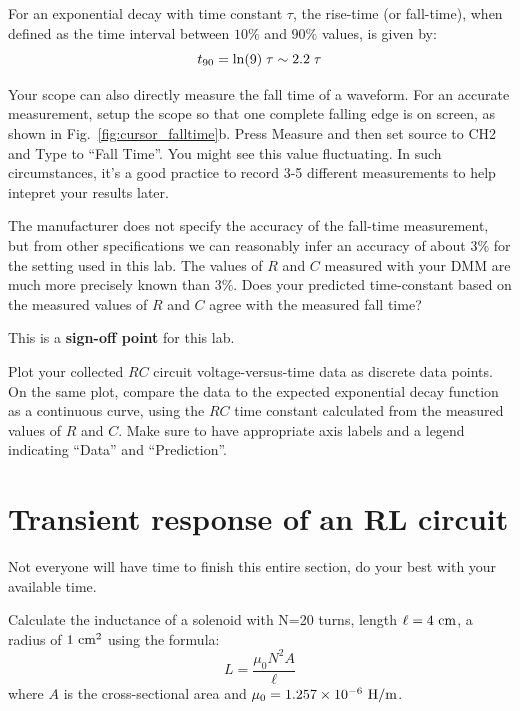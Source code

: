 For an exponential decay with time constant $\tau$, the rise-time (or fall-time),
when defined as the time interval between $10\%$ and $90\%$ values, is
given by:
\begin{displaymath}
t_{90} = {\rm ln}(9) \; \tau \sim 2.2 \; \tau
\end{displaymath}

\begin{measurement}
Your scope can also directly measure the fall time of a waveform.  For
an accurate measurement, setup the scope so that one complete falling
edge is on screen, as shown in Fig.~\ref{fig:cursor_falltime}b.  Press
Measure and then set source to CH2 and Type to ``Fall Time''. You
might see this value fluctuating.  In such circumstances, it's a good
practice to record 3-5 different measurements to help intepret your
results later.

The manufacturer does not specify the accuracy of the fall-time
measurement, but from other specifications we can reasonably infer an
accuracy of about $3\%$ for the setting used in this lab.  The values of $R$ and $C$ measured with your DMM are much more precisely known than $3\%$.  Does your predicted time-constant based on the measured values of $R$ and $C$ agree with the measured fall time?
\end{measurement}

This is a \textbf{sign-off point} for this lab.

\begin{plot}
Plot your collected $RC$ circuit voltage-versus-time data as discrete
data points.  On the same plot, compare the data to the expected
exponential decay function as a continuous curve, using the $RC$ time
constant calculated from the measured values of $R$ and $C$.  Make
sure to have appropriate axis labels and a legend indicating ``Data''
and ``Prediction''.
\end{plot}
  
\section{Transient response of an RL circuit}

Not everyone will have time to finish this entire section, do your
best with your available time.

\begin{measurement}
Calculate the inductance of a solenoid with N=20 turns, length
$\ell=4~\rm cm$, a radius of $1~\rm cm^2$ using the formula:
\begin{displaymath}
L = \frac{\mu_0 N^2 A}{\ell}
\end{displaymath}
where $A$ is the cross-sectional area and $\mu_0 = 1.257 \times 10^{-6}~\rm H/m$.
\end{measurement}


